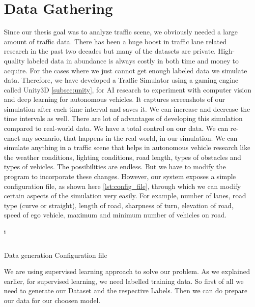 \section{Data Gathering}
\par
Since our thesis goal was to analyze traffic scene, we obviously needed a large amount of traffic data. There has been a huge boost in traffic lane related research in the past two decades but many of the datasets are private. High-quality labeled data in abundance is always costly in both time and money to acquire. For the cases where we just cannot get enough labeled data we simulate data. Therefore, we have developed a Traffic Simulator using a gaming engine called Unity3D \ref{subsec:unity}, for AI research to experiment with computer vision and deep learning for autonomous vehicles. It captures screenshots of our simulation after each time interval and saves it. We can increase and decrease the time intervals as well. There are lot of advantages of developing this simulation compared to real-world data. We have a total control on our data. We can re-enact any scenario, that happens in the real-world, in our simulation. We can simulate anything in a traffic scene that helps in autonomous vehicle research like the weather conditions, lighting conditions, road length, types of obstacles and types of vehicles. The possibilities are endless. But we have to modify the program to incorporate these changes. However, our system exposes a simple configuration file, as shown here \ref{lst:config_file}, through which we can modify certain aspects of the simulation very easily. For example, number of lanes, road type (curve or straight), length of road, sharpness of turn, elevation of road, speed of ego vehicle, maximum and minimum number of vehicles on road.
\par
\begin{listing}i
  \inputminted[frame=lines,framesep=2mm,baselinestretch=1.2,fontsize=\scriptsize,linenos]{json}{Chapter3/config.json}
  \caption{Data generation Configuration file}
  \label{lst:config_file}
\end{listing}
\par
We are using supervised learning approach to solve our problem. As we explained earlier, for supervised learning, we need labelled training data. So first of all we need to generate our Dataset and the respective Labels. Then we can do prepare our data for our choosen model.

